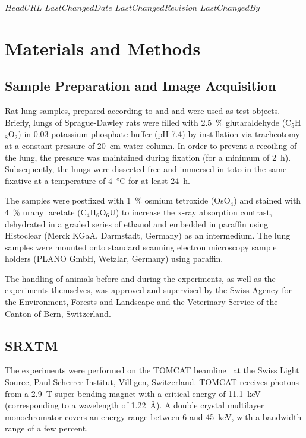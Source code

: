 \svnidlong
{$HeadURL$}
{$LastChangedDate$}
{$LastChangedRevision$}
{$LastChangedBy$}
%
%
\section{Materials and Methods}%
\label{sec:materials and methods}%
\subsection{Sample Preparation and Image Acquisition}%
Rat lung samples, prepared according to %
\ifhtml
	\citet{Tschanz2002} and \citet{Luyet2002}
\else
	 and 
\fi%
were used as test objects. Briefly, lungs of Sprague-Dawley rats were filled with \SI{2.5}{\percent} glutaraldehyde (C$_5$H$_8$O$_2$) in \SI{0.03}{\Molar} potassium-phosphate buffer (pH 7.4) by instillation via tracheotomy at a constant pressure of \SI{20}{\centi\meter} water column. In order to prevent a recoiling of the lung, the pressure was maintained during fixation (for a minimum of \SI{2}{\hour}). Subsequently, the lungs were dissected free and immersed in toto in the same fixative at a temperature of \SI{4}{\celsius} for at least \SI{24}{\hour}.

The samples were postfixed with \SI{1}{\percent} osmium tetroxide (OsO$_4$) and stained with \SI{4}{\percent} uranyl acetate (C$_4$H$_6$O$_6$U) to increase the x-ray absorption contrast, dehydrated in a graded series of ethanol and embedded in paraffin using Histoclear (Merck KGaA, Darmstadt, Germany) as an intermedium. The lung samples were mounted onto standard scanning electron microscopy sample holders (PLANO GmbH, Wetzlar, Germany) using paraffin.

The handling of animals before and during the experiments, as well as the experiments themselves, was approved and supervised by the Swiss Agency for the Environment, Forests and Landscape and the Veterinary Service of the Canton of Bern, Switzerland.

\subsection{SRXTM}%
The experiments were performed on the TOMCAT beamline~\cite{Stampanoni2006a} at the Swiss Light Source, Paul Scherrer Institut, Villigen, Switzerland. TOMCAT receives photons from a \SI{2.9}{\tesla} super-bending magnet with a critical energy of \SI{11.1}{\kilo\electronvolt} (corresponding to a wavelength of \SI{1.22}{\angstrom}). A double crystal multilayer monochromator covers an energy range between 6 and \SI{45}{\kilo\electronvolt}, with a bandwidth range of a few percent.


